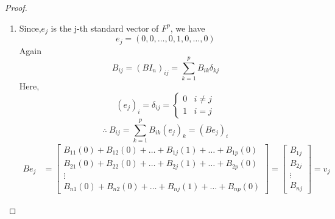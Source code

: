 \documentclass[12pt, a4paper]{article}
\theoremstyle{definition}
\theoremstyle{remark}
\begin{document}
\begin{proof}
\begin{enumerate}
\begin{align*}
\begin{bmatrix}
            A_{m1}B_{1j}+A_{m2}B_{2j}+\ldots+A_{mn}B_{nj} \\
        \end{bmatrix} \\
        &= \begin{bmatrix}
            A_{11} & A_{12} & \ldots & A_{1n} \\
            A_{21} & A_{22} & \ldots & A_{3n} \\
            \vdots & \vdots & \ddots & \vdots \\
            A_{m1} & A_{m2} & \ldots & A_{mn} \\
        \end{bmatrix} . \begin{bmatrix}
            B_{1j} \\ B_{2j} \\ \vdots \\ B_{nj}
        \end{bmatrix} = Av_j
        \end{align*}

        \item Since,$e_j$ is the j-th standard vector of $F^p$, we have
        \[e_j = (0,0,\ldots,0,1,0,\ldots,0)\]
        Again
        \[B_{ij} = (BI_n)_{ij} = \sum_{k=1}^pB_{ik}\delta_{kj}\]
        Here, \[(e_j)_i = \delta_{ij} = \begin{cases}
            0 & i \ne j \\
            1 & i=j
        \end{cases}\]
        \[\therefore \ B_{ij} = \sum_{k=1}^pB_{ik}(e_j)_k = (Be_j)_i\]
        \begin{align*}
            Be_j &= \begin{bmatrix}
                B_{11}(0)+B_{12}(0)+\ldots+B_{1j}(1)+\ldots+B_{1p}(0) \\
                B_{21}(0)+B_{22}(0)+\ldots+B_{2j}(1)+\ldots+B_{2p}(0) \\
                \vdots \\
                B_{n1}(0)+B_{n2}(0)+\ldots+B_{nj}(1)+\ldots+B_{np}(0)
            \end{bmatrix} = \begin{bmatrix}
            B_{1j} \\ B_{2j} \\ \vdots \\ B_{nj}
        \end{bmatrix} = v_j
        \end{align*}
    \end{enumerate}
\end{proof}
\end{document}
